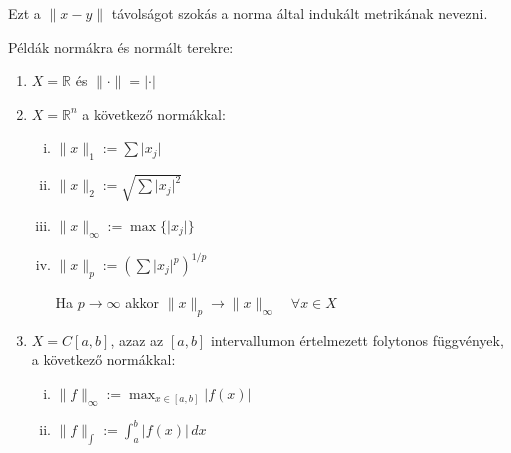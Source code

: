 \begin{megj}
    Ezt a $\| x-y \|$ távolságot szokás a norma által indukált metrikának nevezni.
\end{megj}


\begin{pelda}
    Példák normákra és normált terekre:
\begin{enumerate}
    \item $X = \mathbb{R}$ és $\| \cdot \| = \lvert \cdot \rvert$ 
    
    \item $X = \mathbb{R}^{n}$ a következő normákkal:
    \begin{enumerate}[(i)]
        \item $\| x \|_{1} :=   \sum \lvert x_{j} \rvert$
        \item $\| x \|_{2} := \sqrt{ \sum \lvert x_{j} \rvert^{2} }$
        \item $\| x \|_{\infty} := \max \{ \lvert x_{j} \rvert \}$
        \item $\| x \|_{p} := \left( \sum \lvert x_{j} \rvert^{p} \right)^{1 / p}$
        
        Ha $p \to \infty$ akkor $\| x \|_{p} \to \| x \|_{\infty} \quad \forall x \in X$
    \end{enumerate}

    \item $X = C[a, b]$, azaz az $[a, b]$ intervallumon értelmezett folytonos függvények, a következő normákkal:
    \begin{enumerate}[(i)]
        \item $\| f \|_{\infty} := \max_{x \in[a, b]} \lvert f(x) \rvert$ 
	\item $\| f \|_{\int} := \int _{a}^{b} \lvert f(x) \rvert \, dx$
    \end{enumerate}
		
\end{enumerate}
\end{pelda}

